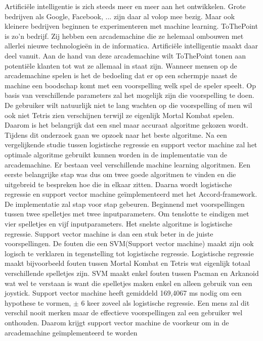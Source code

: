 Artificiële intelligentie is zich steeds meer en meer aan het ontwikkelen. Grote bedrijven als Google, Facebook, ... zijn daar al volop mee bezig. Maar ook kleinere bedrijven beginnen te experimenteren met machine learning. ToThePoint is zo'n bedrijf. Zij hebben een arcademachine die ze helemaal ombouwen met allerlei nieuwe technologieën in de informatica. Artificiële intelligentie maakt daar deel vanuit. Aan de hand van deze arcademachine wilt ToThePoint tonen aan potentiële klanten tot wat ze allemaal in staat zijn. Wanneer mensen op de arcademachine spelen is het de bedoeling dat er op een schermpje naast de machine een boodschap komt met een voorspelling welk spel de speler speelt. Op basis van verschillende parameters zal het mogelijk zijn die voorspelling te doen. De gebruiker wilt natuurlijk niet te lang wachten op die voorspelling of men wil ook niet Tetris zien verschijnen terwijl ze eigenlijk Mortal Kombat spelen. Daarom is het belangrijk dat een snel maar accuraat algoritme gekozen wordt. Tijdens dit onderzoek gaan we opzoek naar het beste algoritme. Na een vergelijkende studie tussen logistische regressie en support vector machine zal het optimale algoritme gebruikt kunnen worden in de implementatie van de arcademachine. Er bestaan veel verschillende machine learning algoritmen. Een eerste belangrijke stap was dus om twee goede algoritmen te vinden en die uitgebreid te bespreken hoe die in elkaar zitten. Daarna wordt logistische regressie en support vector machine geïmplementeerd met het Accord-framework. De implementatie zal stap voor stap gebeuren. Beginnend met voorspellingen tussen twee spelletjes met twee inputparameters. Om tenslotte te eindigen met vier spelletjes en vijf inputparameters. Het snelste algoritme is logistische regressie. Support vector machine is dan een stuk beter in de juiste voorspellingen. De fouten die een SVM(Support vector machine) maakt zijn ook logisch te verklaren in tegenstelling tot logistische regressie. Logistische regressie maakt bijvoorbeeld fouten tussen Mortal Kombat en Tetris wat eigenlijk totaal verschillende spelletjes zijn. SVM maakt enkel fouten tussen Pacman en Arkanoid wat wel te verstaan is want die spelletjes maken enkel en alleen gebruik van een joystick. Support vector machine heeft gemiddeld 169,4067 ms nodig om een hypothese te vormen, $\pm$ 6 keer zoveel als logistische regressie. Een mens zal dit verschil nooit merken maar de effectieve voorspellingen zal een gebruiker wel onthouden. Daarom krijgt support vector machine de voorkeur om in de arcademachine geïmplementeerd te worden
